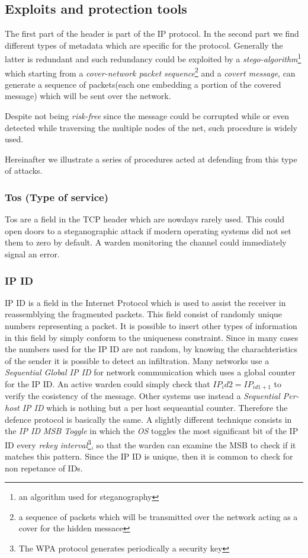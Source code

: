 \documentclass[../../main.tex]{subfiles}
\begin{document}
\subsection{Exploits and protection tools}

The first part of the header is part of the IP protocol.
In the second part we find different types of metadata which
are specific for the protocol. Generally the latter is redundant and such redundancy
could be exploited by a \emph{stego-algorithm}\footnote{an
algorithm used for steganography} which starting from a \emph{cover-network
packet sequence}\footnote{a sequence of packets which will be transmitted
over the network acting as a cover for the hidden messace} and a
\emph{covert message}, can generate a sequence of packets(each one embedding
a portion of the covered message) which will be sent over the network.

Despite not being \emph{risk-free} since the message could be corrupted while or even detected
while traversing the multiple nodes of the net, such procedure is widely used.

Hereinafter we illustrate a series of procedures acted at defending from this type of attacks.

\subsubsection{Tos (Type of service)}
Tos are a field in the TCP header which
are nowdays rarely used. This could open doors to a steganographic attack if
modern operating systems did not set them to zero by default.
A warden monitoring the channel could immediately signal an error.

\subsubsection{IP ID} IP ID is a field in the Internet Protocol which is used to
assist the receiver in reassemblying the fragmented packets.
This field consist of randomly unique numbers representing a packet.
It is possible to insert other types of information in this field by simply
conform to the uniqueness constraint.
Since in many cases the numbers used for the IP ID are not random, by
knowing the charachteristics of the sender it is possible to detect an
infiltration. Many networks use a \emph{Sequential Global IP ID} for network communication which uses a global counter for the
IP ID. An active warden could simply check that $IP_id2 = IP_{id1+1}$ to verify the cosistency of the message. Other systems use instead a \emph{Sequential Per-host IP ID} which is nothing but a per host sequeantial counter. 
Therefore the defence protocol is basically the same. A slightly different technique consists in the \emph{IP ID MSB Toggle} in which the \emph{OS} toggles the most significant bit of the IP ID every \emph{rekey interval}\footnote{The WPA protocol generates periodically a security key},
so that the warden can examine the MSB to check if it matches this pattern. Since the IP ID is unique, then it is common to check for non repetance of IDs.
\end{document}
